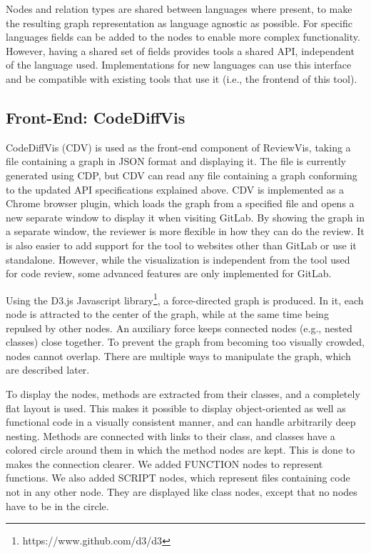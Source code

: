 \documentclass[a4paper,11pt,twoside]{article}
\theoremstyle{definition} %
\begin{document}
Nodes and relation types are shared between languages where present, to make the resulting graph representation as language agnostic as possible. For specific languages fields can be added to the nodes to enable more complex functionality. However, having a shared set of fields provides tools a shared API, independent of the language used. Implementations for new languages can use this interface and be compatible with existing tools that use it (i.e., the frontend of this tool).


\subsection{Front-End: CodeDiffVis} \label{SubSec:Frontend}

CodeDiffVis (CDV) is used as the front-end component of ReviewVis, taking a file containing a graph in JSON format and displaying it. The file is currently generated using CDP, but CDV can read any file containing a graph conforming to the updated API specifications explained above. CDV is implemented as a Chrome browser plugin, which loads the graph from a specified file and opens a new separate window to display it when visiting GitLab. By showing the graph in a separate window, the reviewer is more flexible in how they can do the review. It is also easier to add support for the tool to websites other than GitLab or use it standalone. However, while the visualization is independent from the tool used for code review, some advanced features are only implemented for GitLab. 

Using the D3.js Javascript library\footnote{https://www.github.com/d3/d3}, a force-directed graph is produced. In it, each node is attracted to the center of the graph, while at the same time being repulsed by other nodes. An auxiliary force keeps connected nodes (e.g., nested classes) close together. To prevent the graph from becoming too visually crowded, nodes cannot overlap. There are multiple ways to manipulate the graph, which are described later. 

To display the nodes, methods are extracted from their classes, and a completely flat layout is used. This makes it possible to display object-oriented as well as functional code in a visually consistent manner, and can handle arbitrarily deep nesting. Methods are connected with links to their class, and classes have a colored circle around them in which the method nodes are kept. This is done to makes the connection clearer. We added FUNCTION nodes to represent functions. We also added SCRIPT nodes, which represent files containing code not in any other node. They are displayed like class nodes, except that no nodes have to be in the circle.
\end{document}
